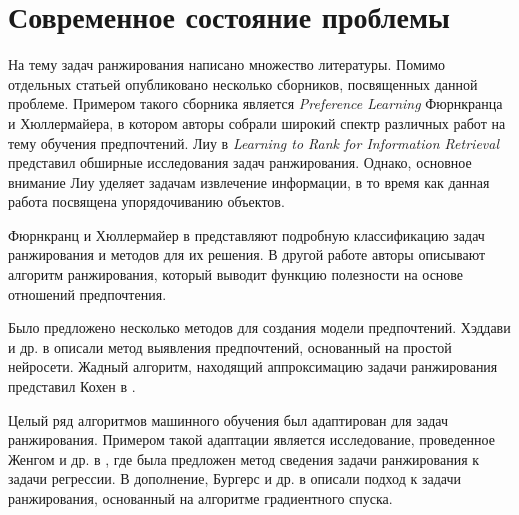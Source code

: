 \chapter*{Современное состояние проблемы}

На тему задач ранжирования написано множество литературы. Помимо отдельных статьей опубликовано несколько сборников, посвященных данной проблеме. Примером такого сборника является \textit{Preference Learning} \cite{plbook:2010} Фюрнкранца и Хюллермайера, в котором авторы собрали широкий спектр различных работ на тему обучения предпочтений. Лиу в \textit{Learning to Rank for Information Retrieval} \cite{Liu:2011} представил обширные исследования задач ранжирования. Однако, основное внимание Лиу уделяет задачам извлечение информации, в то время как данная работа посвящена упорядочиванию объектов.

Фюрнкранц и Хюллермайер в \cite{plbook:Introduction:2010} представляют подробную классификацию задач ранжирования и методов для их решения. В другой работе \cite{Furnkranz:2003} авторы описывают алгоритм ранжирования, который выводит функцию полезности на основе отношений предпочтения.

Было предложено несколько методов для создания модели предпочтений. Хэддави и др. в \cite{Haddawy:2003} описали метод выявления предпочтений, основанный на простой нейросети. Жадный алгоритм, находящий аппроксимацию задачи ранжирования представил Кохен в \cite{Cohen:1999}.

Целый ряд алгоритмов машинного обучения был адаптирован для задач ранжирования. Примером такой адаптации является исследование, проведенное Женгом и др. в \cite{Zheng:2007}, где была предложен метод сведения задачи ранжирования к задачи регрессии. В дополнение, Бургерс и др. в \cite{Burges:2005} описали подход к задачи ранжирования, основанный на алгоритме градиентного спуска.